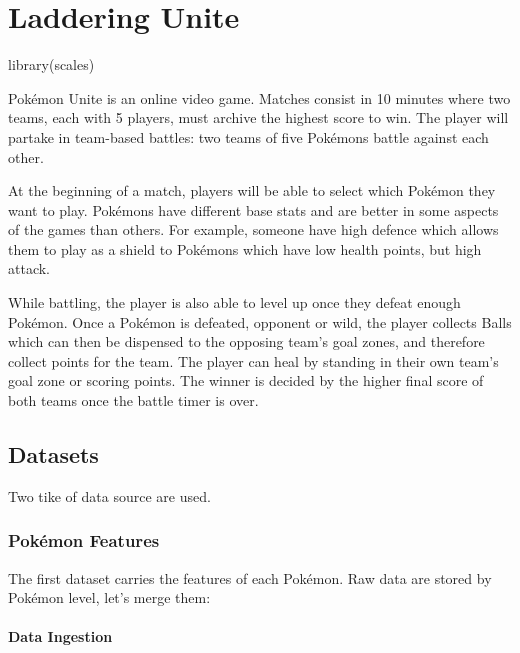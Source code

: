\documentclass[
]{article}
\author{}
\date{\vspace{-2.5em}}
\newenvironment{Shaded}{\begin{snugshade}}{\end{snugshade}}
\newcommand{\FunctionTok}[1]{\textcolor[rgb]{0.00,0.00,0.00}{#1}}
\newcommand{\NormalTok}[1]{#1}
\begin{document}
\hypertarget{laddering-unite}{%
\section{Laddering Unite}\label{laddering-unite}}

\begin{Shaded}
\begin{Highlighting}[]
\FunctionTok{library}\NormalTok{(scales)}
\end{Highlighting}
\end{Shaded}

Pokémon Unite is an online video game. Matches consist in 10 minutes
where two teams, each with 5 players, must archive the highest score to
win. The player will partake in team-based battles: two teams of five
Pokémons battle against each other.

At the beginning of a match, players will be able to select which
Pokémon they want to play. Pokémons have different base stats and are
better in some aspects of the games than others. For example, someone
have high defence which allows them to play as a shield to Pokémons
which have low health points, but high attack.

While battling, the player is also able to level up once they defeat
enough Pokémon. Once a Pokémon is defeated, opponent or wild, the player
collects Balls which can then be dispensed to the opposing team's goal
zones, and therefore collect points for the team. The player can heal by
standing in their own team's goal zone or scoring points. The winner is
decided by the higher final score of both teams once the battle timer is
over.

\hypertarget{datasets}{%
\subsection{Datasets}\label{datasets}}

Two tike of data source are used.

\hypertarget{pokuxe9mon-features}{%
\subsubsection{Pokémon Features}\label{pokuxe9mon-features}}

The first dataset carries the features of each Pokémon. Raw data are
stored by Pokémon level, let's merge them:

\hypertarget{data-ingestion}{%
\paragraph{Data Ingestion}\label{data-ingestion}}
\end{document}
